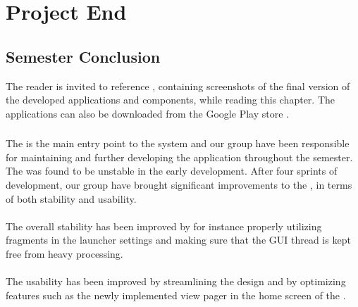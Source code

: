 \part{Project End}
\chapter{Semester Conclusion}
\label{cha:conclusion_final}

The reader is invited to reference , containing screenshots of the final version of the developed applications and components, while reading this chapter. The applications can also be downloaded from the Google Play store \parencite{giraf_google_play}.

\section*{\launcher}
The \launcher is the main entry point to the \giraf system and our group have been responsible for maintaining and further developing the application throughout the semester. The \launcher was found to be unstable in the early development. After four sprints of development, our group have brought significant improvements to the \launcher, in terms of both stability and usability.
\\\\
The overall stability has been improved by for instance properly utilizing fragments in the launcher settings and making sure that the GUI thread is kept free from heavy processing. 
\\\\
The usability has been improved by streamlining the design and by optimizing features such as the newly implemented view pager in the home screen of the \launcher.

